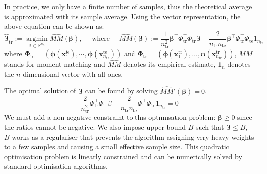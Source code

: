 \documentclass[a4paper,12pt]{article}
\begin{document}
In practice, we only have a finite number of samples, thus the theoretical average is approximated with its sample average. Using the vector representation, the above equation can be shown as:
\begin{equation} \label{kmm_finite}
\hat{\boldsymbol{\beta}}_{\mathrm{tr}}:=\underset{\boldsymbol{\beta} \in \mathbb{R}^{n_{tr}} }{\operatorname{argmin}} \widehat{{MM}}(\boldsymbol{\beta}), \quad \text { where } \quad \widehat{{MM}}(\boldsymbol{\beta}):=\frac{1}{n_{\mathrm{tr}}^{2}} \boldsymbol{\beta}^{\top} \Phi_{\mathrm{tr}}^{\top} \Phi_{\mathrm{tr}} \boldsymbol{\beta}-\frac{2}{n_{\mathrm{tr}} n_{\mathrm{te}}} \boldsymbol{\beta}^{\top} \Phi_{\mathrm{tr}}^{\top} \Phi_{\mathrm{te}} 1_{n_{\mathrm{te}}}
\end{equation}
where $\boldsymbol{\Phi}_{\mathrm{te}}=\left( \boldsymbol{\phi} \left( \boldsymbol{x}_{1}^{\mathrm{te}} \right), \cdots, \boldsymbol{\phi} \left( \boldsymbol{x}_{n_{\mathrm{te}}}^{\mathrm{te}} \right) \right)$ and $\boldsymbol{\Phi}_{\mathrm{tr}}=\left( \boldsymbol{\phi}\left(\boldsymbol{x}_{1}^{\mathrm{tr}}\right), \ldots, \boldsymbol{\phi}\left(\boldsymbol{x}_{n_{\mathrm{tr}}}^{\mathrm{tr}}\right)\right)$, $MM$ stands for moment matching and $\widehat{MM}$ denotes its empirical estimate, $\mathbf{1}_{n}$ denotes the $n$-dimensional vector with all ones. 

The optimal solution of $\boldsymbol{\beta}$ can be found by solving $\widehat{{MM}}'(\boldsymbol{\beta}) = 0$. 
\begin{equation}
\frac{2}{n_{\mathrm{tr}}^{2}} \Phi_{\mathrm{tr}}^{\top} \Phi_{\mathrm{tr}} \beta-\frac{2}{n_{\mathrm{tr}} n_{\mathrm{te}}} \Phi_{\mathrm{tr}}^{\top} \Phi_{\mathrm{te}} 1_{n_{\mathrm{te}}}=0
\end{equation}
We must add a non-negative constraint to this optimisation problem: $\boldsymbol{\beta} \geq 0 $ since the ratios cannot be negative. We also impose upper bound $B$ such that $\boldsymbol{\beta} \leq B$, $B$ works as a regulariser that prevents the algorithm assigning very heavy weights to a few samples and causing a small effective sample size. This quadratic optimisation problem is linearly constrained and can be numerically solved by standard optimisation algorithms.
\end{document}
